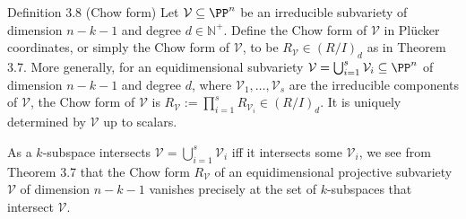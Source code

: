 \begin{result}{Definition 3.8 (Chow form)}
Let $\mathcal V\subseteq\PP^n$ be an irreducible subvariety of dimension $n-k-1$ and degree $d\in\mathbb N^+$. Define the Chow form of $\mathcal V$ in Pl\"ucker coordinates, or simply the Chow form of $\mathcal V$, to be $R_{\mathcal V}\in(R/I)_d$ as in Theorem 3.7.
More generally, for an equidimensional subvariety $\mathcal V=\bigcup_{i=1}^s\mathcal V_i\subseteq\PP^n$ of dimension $n-k-1$ and degree $d$, where $\mathcal V_1,\ldots,\mathcal V_s$ are the irreducible components of $\mathcal V$, the Chow form of $\mathcal V$ is $R_{\mathcal V}:=\prod_{i=1}^sR_{\mathcal V_i}\in(R/I)_d$. It is uniquely determined by $\mathcal V$ up to scalars.
\end{result}
As a $k$-subspace intersects $\mathcal V=\bigcup_{i=1}^s\mathcal V_i$ iff it intersects some $\mathcal V_i$, we see from Theorem 3.7 that the Chow form $R_{\mathcal V}$ of an equidimensional projective subvariety $\mathcal V$ of dimension $n-k-1$ vanishes precisely at the set of $k$-subspaces that intersect $\mathcal V$.
